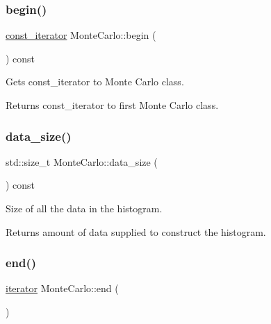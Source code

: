 \subsubsection{\texorpdfstring{begin()}{begin()}\hspace{0.1cm}{\footnotesize\ttfamily [2/2]}}
{\footnotesize\ttfamily \hyperlink{classMonteCarlo_a74dc0884e3b02002956de4fb84a0bb01}{const\+\_\+iterator} Monte\+Carlo\+::begin (\begin{DoxyParamCaption}{ }\end{DoxyParamCaption}) const\hspace{0.3cm}{\ttfamily [inline]}}

Gets const\+\_\+iterator to Monte Carlo class. \begin{DoxyReturn}{Returns}
const\+\_\+iterator to first Monte Carlo class. 
\end{DoxyReturn}
\mbox{\label{classMonteCarlo_a994af145a2a63a51c96a13d6e472b793}} 
\subsubsection{\texorpdfstring{data\+\_\+size()}{data\_size()}}
{\footnotesize\ttfamily std\+::size\+\_\+t Monte\+Carlo\+::data\+\_\+size (\begin{DoxyParamCaption}{ }\end{DoxyParamCaption}) const\hspace{0.3cm}{\ttfamily [inline]}}

Size of all the data in the histogram. \begin{DoxyReturn}{Returns}
amount of data supplied to construct the histogram. 
\end{DoxyReturn}
\mbox{\label{classMonteCarlo_a52b4ed803009aa163306b63796827d61}} 
\subsubsection{\texorpdfstring{end()}{end()}\hspace{0.1cm}{\footnotesize\ttfamily [1/2]}}
{\footnotesize\ttfamily \hyperlink{classMonteCarlo_a8f83ff48a51d2f19e5c87b8fade7bbe3}{iterator} Monte\+Carlo\+::end (\begin{DoxyParamCaption}{ }\end{DoxyParamCaption})\hspace{0.3cm}{\ttfamily [inline]}}

